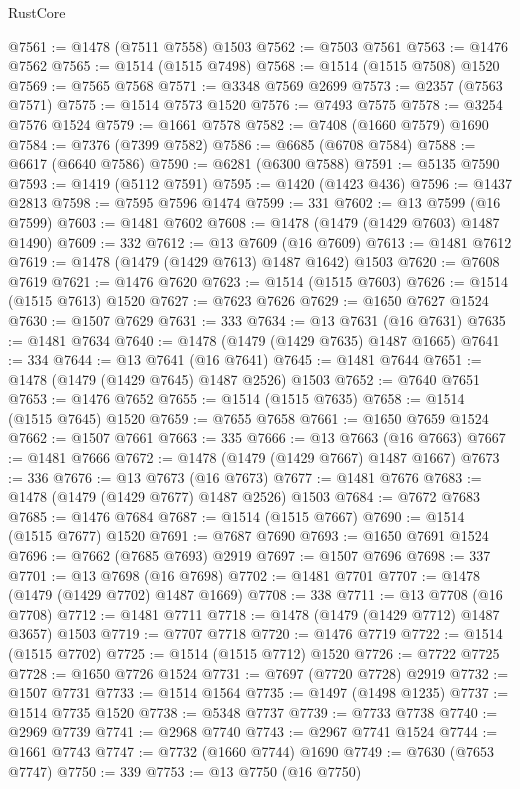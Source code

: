 \begin{lexlean}{RustCore}
\begin{coremodule}
@7561 := @1478 (@7511 @7558) @1503
@7562 := @7503 @7561
@7563 := @1476 @7562
@7565 := @1514 (@1515 @7498)
@7568 := @1514 (@1515 @7508) @1520
@7569 := @7565 @7568
@7571 := @3348 @7569 @2699
@7573 := @2357 (@7563 @7571)
@7575 := @1514 @7573 @1520
@7576 := @7493 @7575
@7578 := @3254 @7576 @1524
@7579 := @1661 @7578
@7582 := @7408 (@1660 @7579) @1690
@7584 := @7376 (@7399 @7582)
@7586 := @6685 (@6708 @7584)
@7588 := @6617 (@6640 @7586)
@7590 := @6281 (@6300 @7588)
@7591 := @5135 @7590
@7593 := @1419 (@5112 @7591)
@7595 := @1420 (@1423 @436)
@7596 := @1437 @2813
@7598 := @7595 @7596 @1474
@7599 := 331
@7602 := @13 @7599 (@16 @7599)
@7603 := @1481 @7602
@7608 := @1478 (@1479 (@1429 @7603) @1487 @1490)
@7609 := 332
@7612 := @13 @7609 (@16 @7609)
@7613 := @1481 @7612
@7619 := @1478 (@1479 (@1429 @7613) @1487 @1642) @1503
@7620 := @7608 @7619
@7621 := @1476 @7620
@7623 := @1514 (@1515 @7603)
@7626 := @1514 (@1515 @7613) @1520
@7627 := @7623 @7626
@7629 := @1650 @7627 @1524
@7630 := @1507 @7629
@7631 := 333
@7634 := @13 @7631 (@16 @7631)
@7635 := @1481 @7634
@7640 := @1478 (@1479 (@1429 @7635) @1487 @1665)
@7641 := 334
@7644 := @13 @7641 (@16 @7641)
@7645 := @1481 @7644
@7651 := @1478 (@1479 (@1429 @7645) @1487 @2526) @1503
@7652 := @7640 @7651
@7653 := @1476 @7652
@7655 := @1514 (@1515 @7635)
@7658 := @1514 (@1515 @7645) @1520
@7659 := @7655 @7658
@7661 := @1650 @7659 @1524
@7662 := @1507 @7661
@7663 := 335
@7666 := @13 @7663 (@16 @7663)
@7667 := @1481 @7666
@7672 := @1478 (@1479 (@1429 @7667) @1487 @1667)
@7673 := 336
@7676 := @13 @7673 (@16 @7673)
@7677 := @1481 @7676
@7683 := @1478 (@1479 (@1429 @7677) @1487 @2526) @1503
@7684 := @7672 @7683
@7685 := @1476 @7684
@7687 := @1514 (@1515 @7667)
@7690 := @1514 (@1515 @7677) @1520
@7691 := @7687 @7690
@7693 := @1650 @7691 @1524
@7696 := @7662 (@7685 @7693) @2919
@7697 := @1507 @7696
@7698 := 337
@7701 := @13 @7698 (@16 @7698)
@7702 := @1481 @7701
@7707 := @1478 (@1479 (@1429 @7702) @1487 @1669)
@7708 := 338
@7711 := @13 @7708 (@16 @7708)
@7712 := @1481 @7711
@7718 := @1478 (@1479 (@1429 @7712) @1487 @3657) @1503
@7719 := @7707 @7718
@7720 := @1476 @7719
@7722 := @1514 (@1515 @7702)
@7725 := @1514 (@1515 @7712) @1520
@7726 := @7722 @7725
@7728 := @1650 @7726 @1524
@7731 := @7697 (@7720 @7728) @2919
@7732 := @1507 @7731
@7733 := @1514 @1564
@7735 := @1497 (@1498 @1235)
@7737 := @1514 @7735 @1520
@7738 := @5348 @7737
@7739 := @7733 @7738
@7740 := @2969 @7739
@7741 := @2968 @7740
@7743 := @2967 @7741 @1524
@7744 := @1661 @7743
@7747 := @7732 (@1660 @7744) @1690
@7749 := @7630 (@7653 @7747)
@7750 := 339
@7753 := @13 @7750 (@16 @7750)

\end{coremodule}
\end{lexlean}
